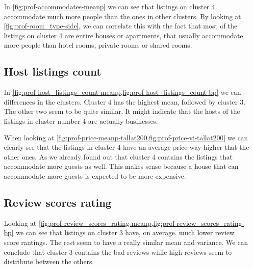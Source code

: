 
In \cref{fig:prof-accommodates-meanp} we can see that listings on cluster 4 accommodate
much more people than the ones in other clusters. By looking at \cref{fig:prof-room_type-side}, we can correlate this with the fact that most of the listings on cluster 4 are entire houses or apartments, that usually accommodate more people than hotel rooms, private rooms or shared rooms.

\clearpage
\subsection{Host listings count}%

In \cref{fig:prof-host_listings_count-meanp,fig:prof-host_listings_count-bp} we can differences in the clusters.
Cluster 4 has the highest mean, followed by cluster 3. The other two seem to be quite
similar. It might indicate that the hosts of the listings in cluster number 4 are actually businesses.

When looking at \cref{fig:prof-price-meanp-tallat200,fig:prof-price-vi-tallat200} we can clearly see that the listings in cluster 4 have an average price way higher that the other ones. As we already found out that cluster 4 contains the listings that accommodate more guests as well. This makes sense because a house that can accommodate more guests is expected to be more expensive.


\subsection{Review scores rating}%
\label{sub:prof-review_scores_rating}


Looking at \cref{fig:prof-review_scores_rating-meanp,fig:prof-review_scores_rating-bp} we can see that listings on cluster 3 have, on average, much lower review score rantings. The rest seem to have a really similar mean and variance. We can conclude that cluster 3 contains the bad reviews while high reviews seem to distribute between the others.

